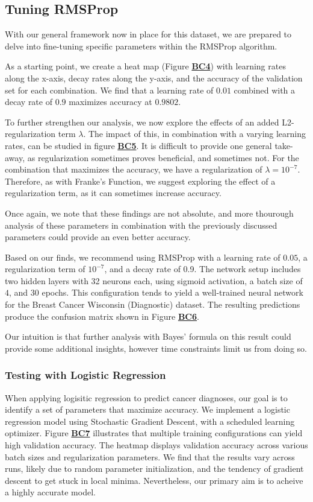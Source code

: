 \documentclass{article}
\begin{document}
\begin{multicols}{2}
\subsection*{Tuning RMSProp}
With our general framework now in place for this dataset, we are prepared to delve into fine-tuning specific parameters within the RMSProp algorithm.

As a starting point, we create a heat map (Figure \hyperref[fig:BC4]{\textbf{BC4}}) with learning rates along the x-axis, decay rates along the y-axis, and the accuracy of the validation set for each combination. We find that a learning rate of $0.01$ combined with a decay rate of $0.9$ maximizes accuracy at $0.9802$.

To further strengthen our analysis, we now explore the effects of an added L2-regularization term $\lambda$. The impact of this, in combination with a varying learning rates, can be studied in figure \hyperref[fig:BC5]{\textbf{BC5}}. It is difficult to provide one general take-away, as regularization sometimes proves beneficial, and sometimes not. For the combination that maximizes the accuracy, we have a regularization of $\lambda = 10^{-7}$. Therefore, as with Franke's Function, we suggest exploring the effect of a regularization term, as it can sometimes increase accuracy.

Once again, we note that these findings are not absolute, and more thourough analysis of these parameters in combination with the previously discussed parameters could provide an even better accuracy. 

Based on our finds, we recommend using RMSProp with a learning rate of $0.05$, a regularization term of $10^{-7}$, and a decay rate of 0.9. The network setup includes two hidden layers with 32 neurons each, using sigmoid activation, a batch size of $4$, and $30$ epochs. This configuration tends to yield a well-trained neural network for the Breast Cancer Wisconsin (Diagnostic) dataset. The resulting predictions produce the confusion matrix shown in Figure \hyperref[fig:BC6]{\textbf{BC6}}.

Our intuition is that further analysis with Bayes' formula on this result could provide some additional insights, however time constraints limit us from doing so.

\subsubsection*{Testing with Logistic Regression}
When applying logisitic regression to predict cancer diagnoses, our goal is to identify a set of parameters that maximize accuracy. We implement a logistic regression model using Stochastic Gradient Descent, with a scheduled learning optimizer. \cite{hjorth-jensen_applied_2021} Figure \hyperref[fig:BC7]{\textbf{BC7}} illustrates  that multiple training configurations can yield high validation accuracy. The heatmap displays validation accuracy across various batch sizes and regularization parameters. We find that the results vary across runs, likely due to random parameter initialization, and the tendency of gradient descent to get stuck in local minima. Nevertheless, our primary aim is to acheive a highly accurate model.


\end{multicols}
\end{document}
